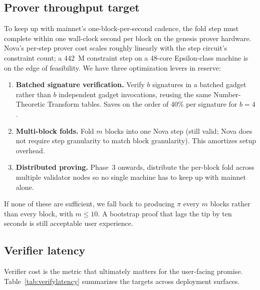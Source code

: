 \documentclass[11pt,a4paper]{article}
\begin{document}
\subsection{Prover throughput target}

To keep up with mainnet's one-block-per-second cadence, the fold step
must complete within one wall-clock second per block on the genesis
prover hardware. Nova's per-step prover cost scales roughly linearly
with the step circuit's constraint count; a 442~M constraint step on
a 48-core Epsilon-class machine is on the edge of feasibility. We
have three optimization levers in reserve:

\begin{enumerate}[leftmargin=*]
  \item \textbf{Batched signature verification.} Verify $b$ signatures
        in a batched gadget rather than $b$ independent gadget invocations,
        reusing the same Number-Theoretic Transform tables. Saves on the
        order of 40\% per signature for $b = 4$.
  \item \textbf{Multi-block folds.} Fold $m$ blocks into one Nova step
        (still valid; Nova does not require step granularity to match
        block granularity). This amortizes setup overhead.
  \item \textbf{Distributed proving.} Phase~3 onwards, distribute the
        per-block fold across multiple validator nodes so no single
        machine has to keep up with mainnet alone.
\end{enumerate}

If none of these are sufficient, we fall back to producing $\pi$ every
$m$ blocks rather than every block, with $m \le 10$. A bootstrap proof
that lags the tip by ten seconds is still acceptable user experience.

\subsection{Verifier latency}

Verifier cost is the metric that ultimately matters for the
user-facing promise. Table~\ref{tab:verifylatency} summarizes the
targets across deployment surfaces.
\end{document}
